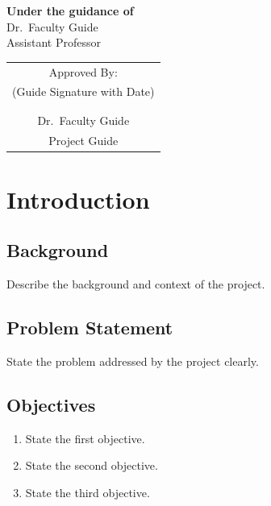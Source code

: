 \documentclass[12pt,a4paper]{report}
\begin{document}
\begin{titlepage}
\begin{center}
\vfill

{\large \textbf{Under the guidance of}}\\[0.2cm]
{\large Dr.\ Faculty Guide}\\
Assistant Professor\\
\vspace{0.6cm}
\begin{tabular}{c}
Approved By: \\
(Guide Signature with Date) \\
 \\
\shortstack{\rule{4cm}{0.4pt}\\
Dr.\ Faculty Guide\\
Project Guide}
\end{tabular}

\vfill



\end{center}
\end{titlepage}



\chapter{Introduction}

\section{Background}
Describe the background and context of the project.

\section{Problem Statement}
State the problem addressed by the project clearly.

\section{Objectives}
\begin{enumerate}
    \item State the first objective.
    \item State the second objective.
    \item State the third objective.
\end{enumerate}
\end{document}
